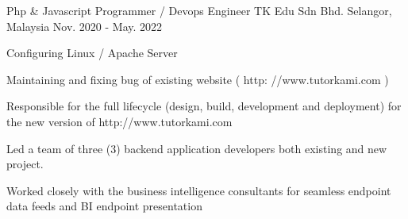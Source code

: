 

\begin{cventries}

  \cventry
    {Php \& Javascript Programmer / Devops Engineer} %
    {TK Edu Sdn Bhd.} %
    {Selangor, Malaysia} %
    {Nov. 2020 - May. 2022} %
    {
      \begin{cvitems} %
      	\item Configuring Linux / Apache Server
      	\item Maintaining and fixing bug of existing website ( http: //www.tutorkami.com )
      	\item Responsible for the full lifecycle (design, build, development and deployment) for the new version of http://www.tutorkami.com
      	\item Led a team of three (3) backend application developers both existing and new project.
      	\item Worked closely with the business intelligence consultants for seamless endpoint data feeds and BI endpoint presentation
      \end{cvitems}
    }


\end{cventries}
